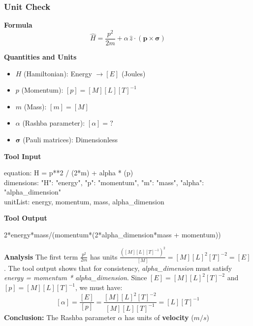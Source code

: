 \documentclass[
	fontsize = 11pt,
	paper = a4,
	draft = false,
	twoside = true,
	titlepage = false
]{scrartcl}
\numberwithin{equation}{subsection}
\begin{document}
	\subsubsection{Unit Check} \label{appendix:unit}
	\begin{tcolorbox}[enhanced, breakable, title=Unit Check of the Rashba Hamiltonian as Stated in the Output, colback=blue!5!white, colframe=blue!75!black] \label{pma:unitHam}
		\textbf{\Large Formula}
		$$
		\hat{H} = \frac{p^2}{2m} + \alpha\,\hat{z}\cdot(\mathbf{p}\times\boldsymbol{\sigma})
		$$
		
		\textbf{\large Quantities and Units}
		\begin{itemize}
			\item[-] $H$ (Hamiltonian): Energy $\rightarrow [E]$ (Joules)
			\item[-] $p$ (Momentum): $[p] = [M][L][T]^{-1}$
			\item[-] $m$ (Mass): $[m] = [M]$
			\item[-] $\alpha$ (Rashba parameter): $[\alpha] = ?$
			\item[-] $\boldsymbol{\sigma}$ (Pauli matrices): Dimensionless
		\end{itemize}
		
		\textbf{\large Tool Input}
		\begin{tcolorbox}[colback=gray!10!white]
			equation: H = p**2 / (2*m) + alpha * (p)\\
			dimensions: {"H": "energy", "p": "momentum", "m": "mass", "alpha": "alpha\_dimension"}\\
			unitList: energy, momentum, mass, alpha\_dimension
		\end{tcolorbox}
		
		
		\textbf{\large Tool Output}
		\begin{tcolorbox}[colback=gray!10!white]
			2*energy*mass/(momentum*(2*alpha\_dimension*mass + momentum))
		\end{tcolorbox}
		
		\textbf{\large Analysis}
		The first term $\frac{p^2}{2m}$ has units $\frac{([M][L][T]^{-1})^2}{[M]} = [M][L]^2[T]^{-2} = [E]$.
		The tool output shows that for consistency, \textit{alpha\_dimension} must satisfy \textit{energy = momentum * alpha\_dimension}.
		Since $[E] = [M][L]^2[T]^{-2}$ and $[p] = [M][L][T]^{-1}$, we must have:
		$$
		[\alpha] = \frac{[E]}{[p]} = \frac{[M][L]^2[T]^{-2}}{[M][L][T]^{-1}} = [L][T]^{-1}
		$$
		\textbf{Conclusion:} The Rashba parameter $\alpha$ has units of \textbf{velocity} ($m/s$)
	\end{tcolorbox}
\end{document}
